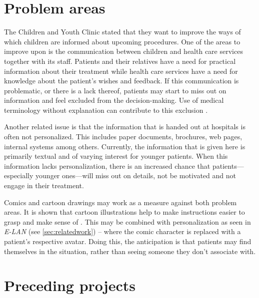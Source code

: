 \section{Problem areas}
\label{sec:problemareas}

The Children and Youth Clinic stated that they want to improve the ways of which children are informed about upcoming procedures. One of the areas to improve upon is the communication between children and health care services together with its staff. Patients and their relatives have a need for practical information about their treatment while health care services have a need for knowledge about the patient's wishes and feedback. If this communication is problematic, or there is a lack thereof, patients may start to miss out on information and feel excluded from the decision-making. Use of medical terminology without explanation can contribute to this exclusion \parencite{coyne2006}.

Another related issue is that the information that is handed out at hospitals is often not personalized. This includes paper documents, brochures, web pages, internal systems among others. Currently, the information that is given here is primarily textual and of varying interest for younger patients. When this information lacks personalization, there is an increased chance that patients---especially younger ones---will miss out on details, not be motivated and not engage in their treatment.

Comics and cartoon drawings may work as a measure against both problem areas. It is shown that cartoon illustrations help to make instructions easier to grasp and make sense of \parencite{delp1996}. This may be combined with personalization as seen in \emph{E-LAN} (see \autoref{sec:relatedwork}) -- where the comic character is replaced with a patient's respective avatar. Doing this, the anticipation is that patients may find themselves in the situation, rather than seeing someone they don't associate with.


\section{Preceding projects}

